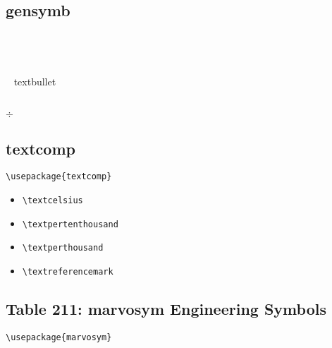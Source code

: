 	\subsection{gensymb}

	\celsius \\
	\perthousand \\
	\degree	\\

	\textbullet ~ textbullet

	\textzerooldstyle\\

	$\div$\\

	\subsection{textcomp}

			\verb|\usepackage{textcomp}|
			

	\begin{itemize}
		\item	\textcelsius  		\verb|\textcelsius|
		\item	\textpertenthousand	\verb|\textpertenthousand|
		\item	\textperthousand		\verb|\textperthousand|
		\item	\textreferencemark		\verb|\textreferencemark|
	\end{itemize}





	\newpage \null
	\subsection{Table 211: marvosym Engineering Symbols}

			\verb|\usepackage{marvosym}|


